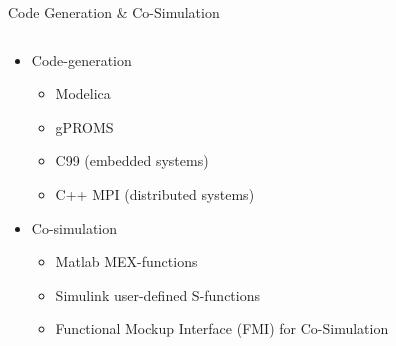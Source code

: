 \documentclass[compress,newPxFont,sthlmFooter]{beamer}
\begin{document}
\begin{frame}{Code Generation \& Co-Simulation}
    \begin{columns}[c]
      \begin{column}{0.5\paperwidth}
        {\small
        \begin{itemize}
            \item \alert{Code-generation}
                \begin{itemize}
                    \item Modelica
                    \item gPROMS
                    \item C99 (embedded systems)
                    \item C++ MPI (distributed systems)
                \end{itemize}
            \item \alert{Co-simulation}
                \begin{itemize}
                    \item Matlab MEX-functions
                    \item Simulink user-defined S-functions
                    \item Functional Mockup Interface (FMI) for Co-Simulation
                \end{itemize}
        \end{itemize}
        }
      \end{column}
      

\end{columns}
\end{frame}
\end{document}
